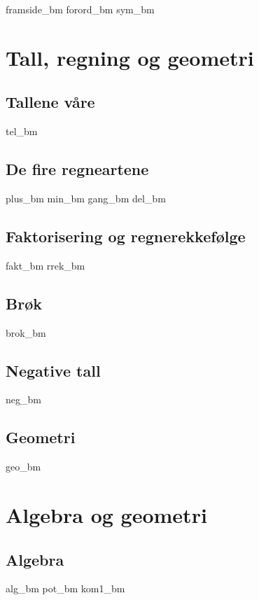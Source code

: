 




{framside_bm}
{forord_bm}
{sym_bm}
\newpage

{\footnotesize \tableofcontents}
\newpage
\part{Tall, regning og geometri}

\chapter{Tallene våre \label{Talavare}}
\newpage
{tel_bm}
%
\chapter{De fire regneartene \label{Rekneartane}}
\newpage
{plus_bm}
{min_bm}
{gang_bm}
{del_bm}
\chapter{Faktorisering og regnerekkefølge}
\newpage
{fakt_bm}
{rrek_bm}

\chapter{Brøk}
\newpage
{brok_bm}

\chapter{Negative tall \label{Negtal}}
\newpage
{neg_bm}


\chapter{Geometri}
\newpage
{geo_bm}

\part{Algebra og geometri \label{Del2}}
\chapter{Algebra}
\newpage
{alg_bm}
{pot_bm}
\newpage
{kom1_bm}

